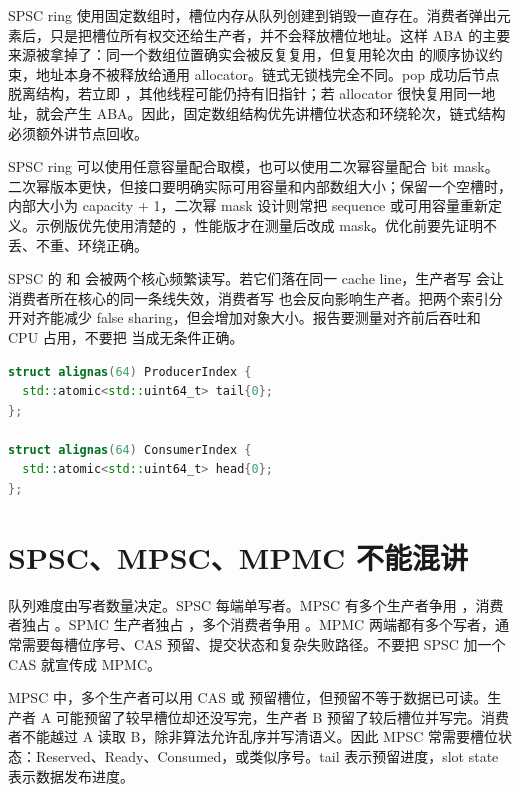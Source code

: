 SPSC ring 使用固定数组时，槽位内存从队列创建到销毁一直存在。消费者弹出元素后，只是把槽位所有权交还给生产者，并不会释放槽位地址。这样 ABA 的主要来源被拿掉了：同一个数组位置确实会被反复复用，但复用轮次由  的顺序协议约束，地址本身不被释放给通用 allocator。链式无锁栈完全不同。pop 成功后节点脱离结构，若立即 ，其他线程可能仍持有旧指针；若 allocator 很快复用同一地址，就会产生 ABA。因此，固定数组结构优先讲槽位状态和环绕轮次，链式结构必须额外讲节点回收。

SPSC ring 可以使用任意容量配合取模，也可以使用二次幂容量配合 bit mask。二次幂版本更快，但接口要明确实际可用容量和内部数组大小；保留一个空槽时，内部大小为 capacity + 1，二次幂 mask 设计则常把 sequence 或可用容量重新定义。示例版优先使用清楚的 ，性能版才在测量后改成 mask。优化前要先证明不丢、不重、环绕正确。

SPSC 的  和  会被两个核心频繁读写。若它们落在同一 cache line，生产者写  会让消费者所在核心的同一条线失效，消费者写  也会反向影响生产者。把两个索引分开对齐能减少 false sharing，但会增加对象大小。报告要测量对齐前后吞吐和 CPU 占用，不要把  当成无条件正确。

\begin{lstlisting}[language=C++,caption={索引对齐表达的是缓存所有权边界}]
struct alignas(64) ProducerIndex {
  std::atomic<std::uint64_t> tail{0};
};

struct alignas(64) ConsumerIndex {
  std::atomic<std::uint64_t> head{0};
};
\end{lstlisting}

\section{SPSC、MPSC、MPMC 不能混讲}

队列难度由写者数量决定。SPSC 每端单写者。MPSC 有多个生产者争用 ，消费者独占 。SPMC 生产者独占 ，多个消费者争用 。MPMC 两端都有多个写者，通常需要每槽位序号、CAS 预留、提交状态和复杂失败路径。不要把 SPSC 加一个 CAS 就宣传成 MPMC。

MPSC 中，多个生产者可以用 CAS 或  预留槽位，但预留不等于数据已可读。生产者 A 可能预留了较早槽位却还没写完，生产者 B 预留了较后槽位并写完。消费者不能越过 A 读取 B，除非算法允许乱序并写清语义。因此 MPSC 常需要槽位状态：Reserved、Ready、Consumed，或类似序号。tail 表示预留进度，slot state 表示数据发布进度。

